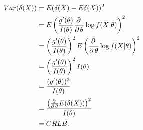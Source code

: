 \begin{solution}
    \begin{align*}
        Var(\delta(X))&=E(\delta(X)-E\delta(X))^2\\
        &=E\left(\frac{g'(\theta)}{I(\theta)}\frac{\partial\,}{\partial\, \theta}\log f(X|\theta)\right)^2\\
        &=\left(\frac{g'(\theta)}{I(\theta)}\right)^2E\left(\frac{\partial\,}{\partial\, \theta}\log f(X|\theta)\right)^2\\
        &=\left(\frac{g'(\theta)}{I(\theta)}\right)^2I(\theta)\\
        &=\frac{(g'(\theta))^2}{I(\theta)}\\
        &=\frac{\left(\frac{\partial\,}{\partial\, \theta}E(\delta(X))\right)^2}{I(\theta)}\\
        &=CRLB. 
    \end{align*}
\end{solution}


